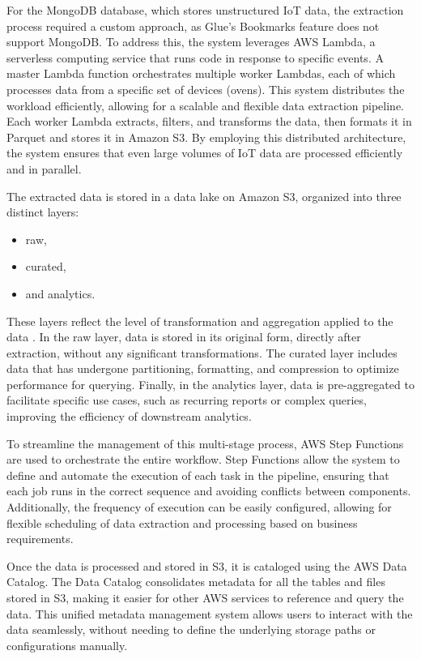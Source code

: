 For the MongoDB database, which stores unstructured \ac{IoT} data, the extraction process required a custom approach, as Glue's Bookmarks feature does not support MongoDB. To address this, the system leverages \ac{AWS} Lambda, a serverless computing service that runs code in response to specific events. A master Lambda function orchestrates multiple worker Lambdas, each of which processes data from a specific set of devices (ovens). This system distributes the workload efficiently, allowing for a scalable and flexible data extraction pipeline. Each worker Lambda extracts, filters, and transforms the data, then formats it in Parquet and stores it in Amazon S3. By employing this distributed architecture, the system ensures that even large volumes of \ac{IoT} data are processed efficiently and in parallel.

The extracted data is stored in a data lake on Amazon S3, organized into three distinct layers:
\begin{itemize}
    \item raw,
    \item curated,
    \item and analytics.
\end{itemize}
These layers reflect the level of transformation and aggregation applied to the data \cite{hlupic2022overview,layers}. In the raw layer, data is stored in its original form, directly after extraction, without any significant transformations. The curated layer includes data that has undergone partitioning, formatting, and compression to optimize performance for querying. Finally, in the analytics layer, data is pre-aggregated to facilitate specific use cases, such as recurring reports or complex queries, improving the efficiency of downstream analytics.

To streamline the management of this multi-stage process, \ac{AWS} Step Functions are used to orchestrate the entire workflow. Step Functions allow the system to define and automate the execution of each task in the pipeline, ensuring that each job runs in the correct sequence and avoiding conflicts between components. Additionally, the frequency of execution can be easily configured, allowing for flexible scheduling of data extraction and processing based on business requirements.

Once the data is processed and stored in S3, it is cataloged using the \ac{AWS} Data Catalog. The Data Catalog consolidates metadata for all the tables and files stored in S3, making it easier for other \ac{AWS} services to reference and query the data. This unified metadata management system allows users to interact with the data seamlessly, without needing to define the underlying storage paths or configurations manually.

